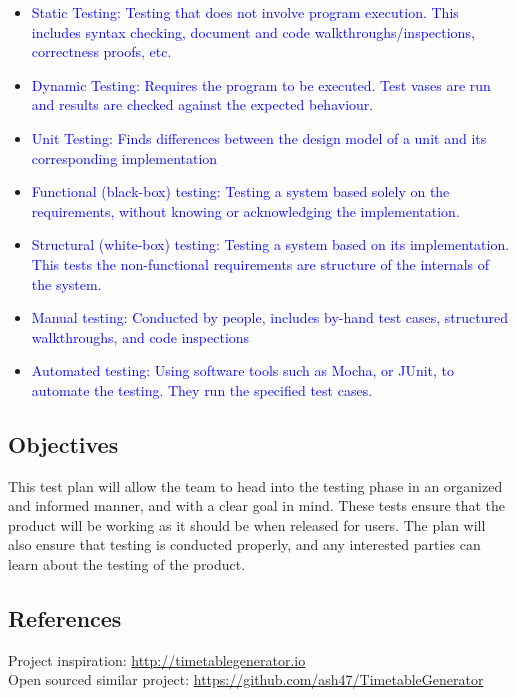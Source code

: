 \documentclass[11pt, oneside]{article}   	%
\begin{document}
\begin{itemize}

\item \textcolor{blue}{Static Testing: Testing that does not involve program execution. This includes syntax checking, document and code walkthroughs/inspections, correctness proofs, etc.} 
\item \textcolor{blue}{Dynamic Testing: Requires the program to be executed. Test vases are run and results are checked against the expected behaviour. }
\item \textcolor{blue}{Unit Testing: Finds differences between the design model of a unit and its corresponding implementation}
\item \textcolor{blue}{Functional (black-box) testing: Testing a system based solely on the requirements, without knowing or acknowledging the implementation.}
\item \textcolor{blue}{Structural (white-box) testing: Testing a system based on its implementation. This tests the non-functional requirements are structure of the internals of the system.}
\item \textcolor{blue}{Manual testing: Conducted by people, includes by-hand test cases, structured walkthroughs, and code inspections}
\item \textcolor{blue}{Automated testing: Using software tools such as Mocha, or JUnit, to automate the testing. They run the specified test cases. }

\end{itemize}

\subsection{Objectives}
This test plan will allow the team to head into the testing phase in an organized and informed manner, and with a clear goal in mind. These tests ensure that the product will be working as it should be when released for users. The plan will also ensure that testing is conducted properly, and any interested parties can learn about the testing of the product.\

\subsection{References}
Project inspiration: \url{http://timetablegenerator.io} \\
Open sourced similar project: \url{https://github.com/ash47/TimetableGenerator}
\end{document}
